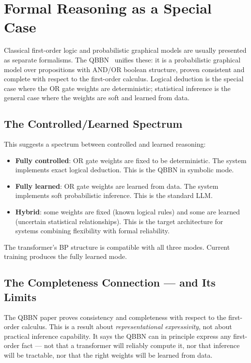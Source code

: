 \section{Formal Reasoning as a Special Case}
\label{sec:formal-reasoning}

Classical first-order logic and probabilistic graphical models are usually
presented as separate formalisms. The QBBN~\cite{coppola2024qbbn} unifies
these: it is a probabilistic graphical model over propositions with AND/OR
boolean structure, proven consistent and complete with respect to the
first-order calculus. Logical deduction is the special case where the OR
gate weights are deterministic; statistical inference is the general case
where the weights are soft and learned from data.

\subsection*{The Controlled/Learned Spectrum}

This suggests a spectrum between controlled and learned reasoning:

\begin{itemize}
\item \textbf{Fully controlled}: OR gate weights are fixed to be
deterministic. The system implements exact logical deduction. This is the
QBBN in symbolic mode.

\item \textbf{Fully learned}: OR gate weights are learned from data. The
system implements soft probabilistic inference. This is the standard LLM.

\item \textbf{Hybrid}: some weights are fixed (known logical rules) and
some are learned (uncertain statistical relationships). This is the target
architecture for systems combining flexibility with formal reliability.
\end{itemize}

The transformer's BP structure is compatible with all three modes. Current
training produces the fully learned mode.

\subsection*{The Completeness Connection --- and Its Limits}

The QBBN paper proves consistency and completeness with respect to the
first-order calculus. This is a result about \emph{representational
expressivity}, not about practical inference capability. It says the QBBN
can in principle express any first-order fact --- not that a transformer
will reliably compute it, nor that inference will be tractable, nor that
the right weights will be learned from data.

